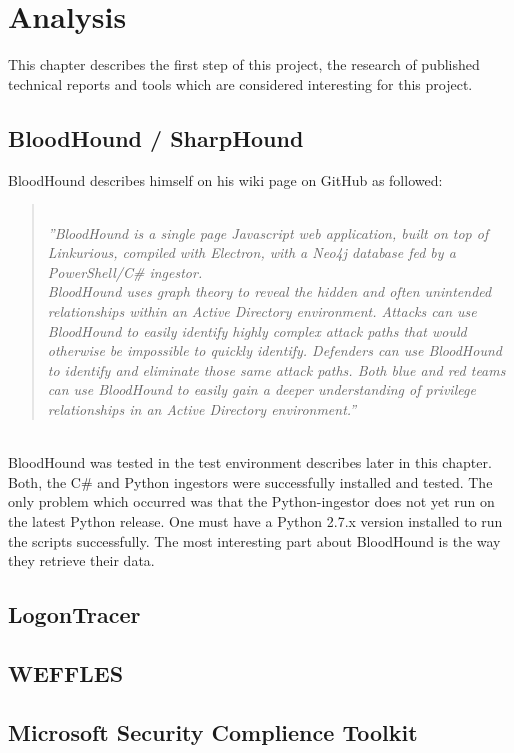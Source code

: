 \section{Analysis}
This chapter describes the first step of this project, the research of published technical reports and tools which are considered interesting for this project.
\subsection{BloodHound / SharpHound}
BloodHound describes himself on his wiki page on GitHub as followed:
\begin{quotation} \ \\
\textit{''BloodHound is a single page Javascript web application, built on top of Linkurious, compiled with Electron, with a Neo4j database fed by a PowerShell/C\# ingestor. \\
BloodHound uses graph theory to reveal the hidden and often unintended relationships within an Active Directory environment. Attacks can use BloodHound to easily identify highly complex attack paths that would otherwise be impossible to quickly identify. Defenders can use BloodHound to identify and eliminate those same attack paths. Both blue and red teams can use BloodHound to easily gain a deeper understanding of privilege relationships in an Active Directory environment.''} 
\cite{blo2018}
\end{quotation}
\ \\
BloodHound was tested in the test environment describes later in this chapter. Both, the C\# and Python ingestors were successfully installed and tested. The only problem which occurred was that the Python-ingestor does not yet run on the latest Python release. One must have a Python 2.7.x version installed to run the scripts successfully.
The most interesting part about BloodHound is the way they retrieve their data.

\subsection{LogonTracer}

\subsection{WEFFLES}

\subsection{Microsoft Security Complience Toolkit}
